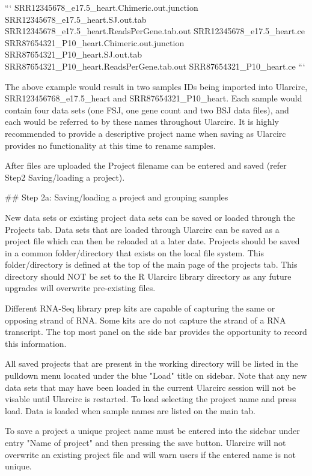 ```
SRR12345678_e17.5_heart.Chimeric.out.junction 
SRR12345678_e17.5_heart.SJ.out.tab
SRR12345678_e17.5_heart.ReadsPerGene.tab.out
SRR12345678_e17.5_heart.ce
SRR87654321_P10_heart.Chimeric.out.junction   
SRR87654321_P10_heart.SJ.out.tab
SRR87654321_P10_heart.ReadsPerGene.tab.out
SRR87654321_P10_heart.ce
```


The above example would result in two samples IDs being imported into Ularcirc, SRR123456768_e17.5_heart and SRR87654321_P10_heart. Each sample would contain four data sets (one FSJ, one gene count and two BSJ data files), and each would be referred to by these names throughout Ularcirc. It is highly recommended to provide a descriptive project name when saving as Ularcirc provides no functionality at this time to rename samples.

After files are uploaded the Project filename can be entered and saved (refer Step2 Saving/loading a project).


## Step 2a: Saving/loading a project and grouping samples

New data sets or existing project data sets can be saved or loaded through the Projects tab. Data sets that are loaded through Ularcirc can be saved as a project file which can then be reloaded at a later date. Projects should be saved in a common folder/directory that exists on the local file system. This folder/directory is defined at the top of the  main page of the projects tab. This directory should NOT be set to the R Ularcirc library  directory as any future upgrades will overwrite pre-existing files. 

Different RNA-Seq library prep kits are capable of capturing the same or opposing strand of RNA. Some kits are do not capture the strand of a RNA transcript. The top most panel on the side bar provides the opportunity to record this information.

All saved projects that are present in the working directory will be listed in the pulldown menu located under the blue "Load" title on sidebar. Note that any new data sets that may have been loaded in the current Ularcirc session will not be visable until Ularcirc is restarted. To load selecting the project name and press load. Data is loaded when sample names are listed on the main tab.

To save a project a unique project name must be entered into the sidebar under entry "Name of project" and then pressing the save button. Ularcirc will not overwrite an existing project file and will warn users if the entered name is not unique.

